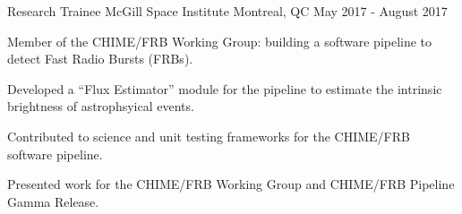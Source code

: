 \begin{cventries}
  \cventry
    {Research Trainee} %
    {McGill Space Institute} %
    {Montreal, QC} %
    {May 2017 - August 2017} %
    {
      \begin{cvitems} %
        \item {Member of the CHIME/FRB Working Group: building a software pipeline to detect Fast Radio Bursts (FRBs).}
        \item {Developed a ``Flux Estimator'' module for the pipeline to estimate the intrinsic brightness of astrophsyical events.}
        \item {Contributed to science and unit testing frameworks for the CHIME/FRB software pipeline.}
        \item {Presented work for the CHIME/FRB Working Group and CHIME/FRB Pipeline Gamma Release.}
      \end{cvitems}
    }



\end{cventries}
